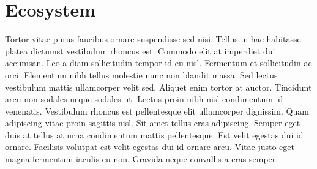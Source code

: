 \section{Ecosystem}

Tortor vitae purus faucibus ornare suspendisse sed nisi. Tellus in hac habitasse platea dictumst vestibulum rhoncus est. Commodo elit at imperdiet dui accumsan. Leo a diam sollicitudin tempor id eu nisl. Fermentum et sollicitudin ac orci. Elementum nibh tellus molestie nunc non blandit massa. Sed lectus vestibulum mattis ullamcorper velit sed. Aliquet enim tortor at auctor. Tincidunt arcu non sodales neque sodales ut. Lectus proin nibh nisl condimentum id venenatis. Vestibulum rhoncus est pellentesque elit ullamcorper dignissim. Quam adipiscing vitae proin sagittis nisl. Sit amet tellus cras adipiscing. Semper eget duis at tellus at urna condimentum mattis pellentesque. Est velit egestas dui id ornare. Facilisis volutpat est velit egestas dui id ornare arcu. Vitae justo eget magna fermentum iaculis eu non. Gravida neque convallis a cras semper.
